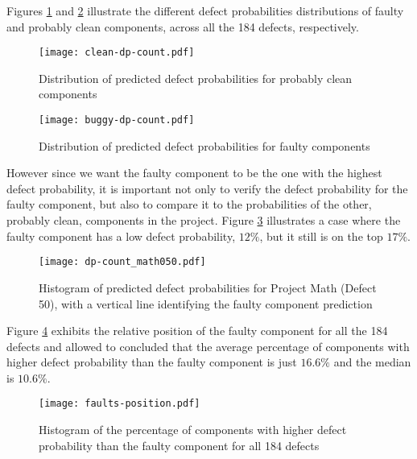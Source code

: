 Figures \ref{fig:clean-dp-count} and \ref{fig:buggy-dp-count} illustrate the different defect probabilities distributions of faulty and probably clean components, across all the 184 defects, respectively.
%
\begin{figure}[!]
  \begin{center}
    \leavevmode
    \texttt{[image: clean-dp-count.pdf]}
    \caption{Distribution of predicted defect probabilities for probably clean components}
    \label{fig:clean-dp-count}
  \end{center}
\end{figure}
%
\begin{figure}[!]
  \begin{center}
    \leavevmode
    \texttt{[image: buggy-dp-count.pdf]}
    \caption{Distribution of predicted defect probabilities for faulty components}
    \label{fig:buggy-dp-count}
  \end{center}
\end{figure}
%
However since we want the faulty component to be the one with the highest defect probability, it is important not only to verify the defect probability for the faulty component, but also to compare it to the probabilities of the other, probably clean, components in the project. Figure \ref{fig:dp-count} illustrates a case where the faulty component has a low defect probability, $12\%$, but it still is on the top $17\%$.
%
\begin{figure}[!]
  \begin{center}
    \leavevmode
    \texttt{[image: dp-count\_math050.pdf]}
    \caption{Histogram of predicted defect probabilities for Project Math (Defect 50), with a vertical line identifying the faulty component prediction}
    \label{fig:dp-count}
  \end{center}
\end{figure}

Figure \ref{fig:dp-faults-position} exhibits the relative position of the faulty component for all the 184 defects and allowed to concluded that the average percentage of components with higher defect probability than the faulty component is just $16.6\%$ and the median is $10.6\%$.

\begin{figure}[!]
  \begin{center}
    \leavevmode
    \texttt{[image: faults-position.pdf]}
    \caption{Histogram of the percentage of components with higher defect probability than the faulty component for all 184 defects}
    \label{fig:dp-faults-position}
  \end{center}
\end{figure}

